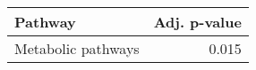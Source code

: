 \begin{tabular}{lr}
\toprule
            Pathway &  Adj. p-value \\
\midrule
 Metabolic pathways &         0.015 \\
\bottomrule
\end{tabular}
